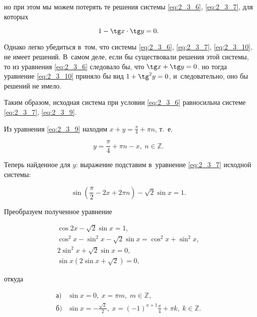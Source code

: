 \noindent
но при этом мы можем потерять те решения системы
{\eqref{eq:2_3_6}, \eqref{eq:2_3_7}}, для которых

\begin{equation}\label{eq:2_3_10}
1 - \tg x \cdot \tg y = 0.
\end{equation}

\noindent
Однако легко убедиться в~том, что системы
{\eqref{eq:2_3_6}, \eqref{eq:2_3_7}, \eqref{eq:2_3_10}}, не имеет решений.
В~самом деле, если бы существовали решения этой системы, то из уравнения
\eqref{eq:2_3_6} следовало бы, что $\tg x + \tg y = 0$.
но тогда уравнение \eqref{eq:2_3_10} приняло бы вид $1 + \tg^{2} y = 0$,
и~следовательно, оно бы решений не имело.

Таким образом, исходная система при условии \eqref{eq:2_3_6} равносильна системе
{\eqref{eq:2_3_7}, \eqref{eq:2_3_9}}.

Из уравнения \eqref{eq:2_3_9} находим $\displaystyle x + y = \frac{\pi}{4} + \pi n$,
т.~е.\

\begin{equation}\label{eq:2_3_11}
\displaystyle y = \frac{\pi}{4} + \pi n - x, \; n \in \mathbb{Z}.
\end{equation}

\noindent
Теперь найденное для $y$: выражение подставим в~уравнение \eqref{eq:2_3_7}
исходной системы:

\begin{equation*}
\displaystyle \sin \left( \frac{\pi}{2} - 2x + 2\pi n \right) -
\sqrt{2}\sin x = 1.
\end{equation*}

\noindent
Преобразуем полученное уравнение

\begin{gather*}
\cos 2x - \sqrt{2}\sin x = 1, \\
\cos^{2} x - \sin^{2} x - \sqrt{2}\sin x = \cos^{2} x + \sin^{2} x, \\
2\sin^{2} x + \sqrt{2}\sin x = 0, \\
\sin x \left( 2\sin x + \sqrt{2} \right ) = 0,
\end{gather*}

\noindent
откуда

\begin{align*}
\text{а)} &\sin x = 0, \; x = \pi m, \; m \in \mathbb{Z}, \\
\displaystyle \text{б)} &\sin x = -\frac{\sqrt{2}}{2}, \;
x = (-1) ^{x + 1}\frac{\pi}{4} + \pi k, \; k \in \mathbb{Z}. \\ 
\end{align*}

